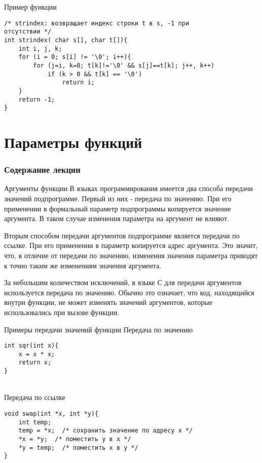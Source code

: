 \documentclass{beamer}
\begin{document}
\begin{frame}[fragile]{Пример функции}
\begin{verbatim}
/* strindex: возвращает индекс строки t в s, -1 при 
отсутствии */
int strindex( char s[], char t[]){
    int i, j, k;
    for (i = 0; s[i] != '\0'; i++){
        for (j=i, k=0; t[k]!='\0' && s[j]==t[k]; j++, k++)
            if (k > 0 && t[k] == '\0')
                return i;
    }
    return -1;
}
\end{verbatim}
\end{frame}

\section{Параметры функций}

\begin{frame}
  \frametitle{Содержание лекции}
  \tableofcontents[current]
\end{frame}

\begin{frame}{Аргументы функции}
    В языках программирования имеется два способа передачи значений подпрограмме. Первый из них - передача по значению. При его применении в формальный параметр подпрограммы копируется значение аргумента. В таком случае изменения параметра на аргумент не влияют.
    
    \medskip
    Вторым способом передачи аргументов подпрограмме является передачи по ссылке. При его применении в параметр копируется адрес аргумента. Это значит, что, в отличие от передачи по значению, изменения значения параметра приводят к точно таким же изменениям значения аргумента.
    
    \medskip
    За небольшим количеством исключений, в языке С для передачи аргументов используется передача по значению. Обычно это означает, что код, находящийся внутри функции, не может изменять значений аргументов, которые использовались при вызове функции.
\end{frame}

\begin{frame}[fragile]{Примеры передачи значений функции}
Передача по значению
\begin{verbatim}
int sqr(int x){
    x = x * x;
    return x;
}
\end{verbatim}

\\
Передача по ссылке
\begin{verbatim}
void swap(int *x, int *y){
    int temp;
    temp = *x;  /* сохранить значение по адресу x */
    *x = *y;  /* поместить y в x */
    *y = temp;  /* поместить x в y */
}
\end{verbatim}
\end{frame}
\end{document}

